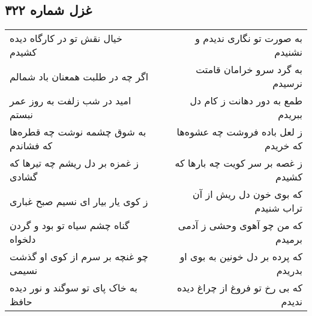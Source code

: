 \begin{center}
\section*{غزل شماره ۳۲۲}
\label{sec:sh322}
\begin{longtable}{l p{0.5cm} r}
خیال نقش تو در کارگاه دیده کشیدم
&&
به صورت تو نگاری ندیدم و نشنیدم
\\
اگر چه در طلبت همعنان باد شمالم
&&
به گرد سرو خرامان قامتت نرسیدم
\\
امید در شب زلفت به روز عمر نبستم
&&
طمع به دور دهانت ز کام دل ببریدم
\\
به شوق چشمه نوشت چه قطره‌ها که فشاندم
&&
ز لعل باده فروشت چه عشوه‌ها که خریدم
\\
ز غمزه بر دل ریشم چه تیرها که گشادی
&&
ز غصه بر سر کویت چه بارها که کشیدم
\\
ز کوی یار بیار ای نسیم صبح غباری
&&
که بوی خون دل ریش از آن تراب شنیدم
\\
گناه چشم سیاه تو بود و گردن دلخواه
&&
که من چو آهوی وحشی ز آدمی برمیدم
\\
چو غنچه بر سرم از کوی او گذشت نسیمی
&&
که پرده بر دل خونین به بوی او بدریدم
\\
به خاک پای تو سوگند و نور دیده حافظ
&&
که بی رخ تو فروغ از چراغ دیده ندیدم
\\
\end{longtable}
\end{center}
